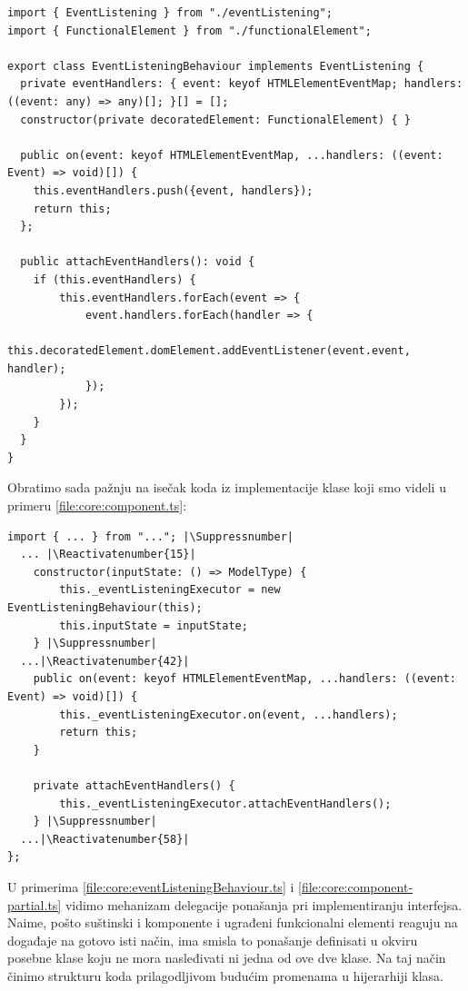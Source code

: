 \documentclass[12pt,oneside]{memoir}
\makeatletter
\newcommand{\code}[1]{\colorbox{codegray}{\texttt{\scalebox{0.9}{#1}}}}%
\let\origthelstnumber\thelstnumber
\newcommand*\Suppressnumber{%
  \lst@AddToHook{OnNewLine}{%
    \let\thelstnumber\relax%
     \advance\c@lstnumber-\@ne\relax%
    }%
}
\newcommand*\Reactivatenumber[1]{%
  \setcounter{lstnumber}{\numexpr#1-1\relax}
  \lst@AddToHook{OnNewLine}{%
   \let\thelstnumber\origthelstnumber%
   \refstepcounter{lstnumber}
  }%
}
\makeatother
\begin{document}
\begin{lstlisting}[style=jsStyle, escapeinside=\#\#, caption={Fajl \code{core/eventListeningBehaviour.ts}},label=file:core:eventListeningBehaviour.ts]
import { EventListening } from "./eventListening";
import { FunctionalElement } from "./functionalElement";

export class EventListeningBehaviour implements EventListening {
  private eventHandlers: { event: keyof HTMLElementEventMap; handlers: ((event: any) => any)[]; }[] = [];
  constructor(private decoratedElement: FunctionalElement) { }

  public on(event: keyof HTMLElementEventMap, ...handlers: ((event: Event) => void)[]) {
    this.eventHandlers.push({event, handlers});
    return this;
  };

  public attachEventHandlers(): void {
    if (this.eventHandlers) {
        this.eventHandlers.forEach(event => {
            event.handlers.forEach(handler => {
              this.decoratedElement.domElement.addEventListener(event.event, handler);
            });
        });
    }
  }
}
\end{lstlisting}
Obratimo sada pažnju na isečak koda iz implementacije klase \code{Component<T>} koji smo videli u primeru \ref{file:core:component.ts}:
\begin{lstlisting}[style=jsStyle, caption={Isečak koda iz fajla \code{core/component.ts}},label=file:core:component-partial.ts]
import { ... } from "..."; |\Suppressnumber|
  ... |\Reactivatenumber{15}|
    constructor(inputState: () => ModelType) {
        this._eventListeningExecutor = new EventListeningBehaviour(this);
        this.inputState = inputState;
    } |\Suppressnumber|
  ...|\Reactivatenumber{42}|
    public on(event: keyof HTMLElementEventMap, ...handlers: ((event: Event) => void)[]) {
        this._eventListeningExecutor.on(event, ...handlers);
        return this;
    }

    private attachEventHandlers() {
        this._eventListeningExecutor.attachEventHandlers();
    } |\Suppressnumber|
  ...|\Reactivatenumber{58}|
};

\end{lstlisting}
U primerima \ref{file:core:eventListeningBehaviour.ts} i \ref{file:core:component-partial.ts}
vidimo mehanizam delegacije ponašanja pri implementiranju interfejsa.
Naime, pošto suštinski i komponente i ugrađeni funkcionalni elementi reaguju na događaje na gotovo isti način,
ima smisla to ponašanje definisati u okviru posebne klase koju ne mora nasleđivati ni jedna od ove dve klase.
Na taj način činimo strukturu koda prilagodljivom budućim promenama u hijerarhiji klasa.
\end{document}
